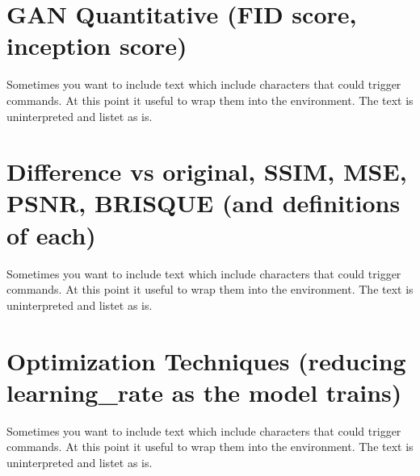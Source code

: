 \section{GAN Quantitative (FID score, inception score)}

Sometimes you want to include text which include characters that could trigger commands. At this point it useful to wrap them into the  environment. The text is uninterpreted and listet as is.

\section{Difference vs original, SSIM, MSE, PSNR, BRISQUE (and definitions of each)}

Sometimes you want to include text which include characters that could trigger commands. At this point it useful to wrap them into the  environment. The text is uninterpreted and listet as is.

\section{Optimization Techniques (reducing learning\_rate as the model trains)}

Sometimes you want to include text which include characters that could trigger commands. At this point it useful to wrap them into the  environment. The text is uninterpreted and listet as is.
